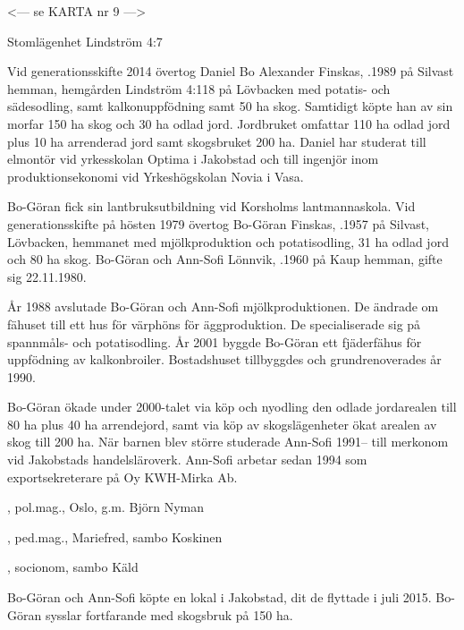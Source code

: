 
<--- se KARTA nr 9 --->



Stomlägenhet Lindström 4:7


Vid generationsskifte 2014 övertog Daniel Bo Alexander Finskas, .1989 på Silvast hemman, hemgården Lindström 4:118 på Lövbacken med potatis- och sädesodling, samt kalkonuppfödning samt 50 ha skog. Samtidigt köpte han av sin morfar 150 ha skog och 30 ha odlad jord. Jordbruket omfattar 110 ha odlad jord plus 10 ha arrenderad jord samt skogsbruket 200 ha. Daniel har studerat till elmontör vid yrkesskolan Optima i Jakobstad och till ingenjör inom produktionsekonomi vid Yrkeshögskolan Novia i Vasa.


Bo-Göran fick sin lantbruksutbildning vid Korsholms lantmannaskola. Vid generationsskifte på hösten 1979 övertog Bo-Göran Finskas, .1957 på Silvast, Lövbacken, hemmanet med mjölkproduktion och potatisodling, 31 ha odlad jord och 80 ha skog. Bo-Göran och Ann-Sofi Lönnvik, .1960 på Kaup hemman, gifte sig 22.11.1980.

År 1988 avslutade Bo-Göran och Ann-Sofi mjölkproduktionen. De ändrade om fähuset till ett hus för värphöns för äggproduktion. De specialiserade sig på spannmåls- och potatisodling. År 2001 byggde Bo-Göran ett fjäderfähus för uppfödning av kalkonbroiler. Bostadshuset tillbyggdes och grundrenoverades år 1990.

Bo-Göran ökade under 2000-talet via köp och nyodling den odlade jordarealen till 80 ha plus 40 ha arrendejord, samt via köp av skogslägenheter ökat arealen av skog till 200 ha. När 	barnen blev större studerade Ann-Sofi 1991-- till merkonom vid 	Jakobstads handelsläroverk. Ann-Sofi arbetar sedan 1994 som exportsekreterare på Oy KWH-Mirka Ab.
\begin{jhchildren}
  \item {}, pol.mag., Oslo, g.m. Björn Nyman
  \item {}, ped.mag., Mariefred, sambo Koskinen
  \item {}, socionom, sambo Käld
  \item {}
\end{jhchildren}
Bo-Göran och Ann-Sofi köpte en lokal i Jakobstad, dit de flyttade i juli 2015. Bo-Göran sysslar fortfarande med skogsbruk på 150 ha.



